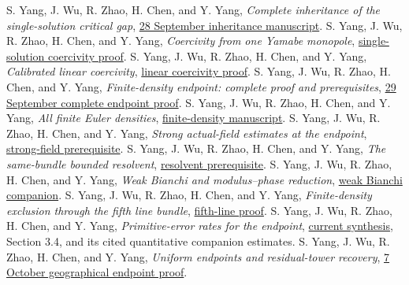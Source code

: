 \documentclass[11pt,a4paper]{article}
\theoremstyle{definition}
\theoremstyle{remark}
\newcommand{\repo}[2]{\href{https://github.com/Cherish0925/Geometric-Analysis/blob/main/#1}{#2}}
\begin{document}
\begin{thebibliography}{99}
 S. Yang, J. Wu, R. Zhao, H. Chen, and Y. Yang, \emph{Complete inheritance of the single-solution critical gap}, \repo{archive/originals/2026-09-28/03_N1_Complete_Inheritance.md}{28 September inheritance manuscript}.
 S. Yang, J. Wu, R. Zhao, H. Chen, and Y. Yang, \emph{Coercivity from one Yamabe monopole}, \repo{research/packages/20261007_Einstein_Gaps_Two_Sessions--9d4f2de3/20261007_Einstein_Gaps_Two_Sessions/sources/Skills/geometric-analysis/research/paper/sections/single_solution_coercivity.tex}{single-solution coercivity proof}.
 S. Yang, J. Wu, R. Zhao, H. Chen, and Y. Yang, \emph{Calibrated linear coercivity}, \repo{research/packages/20261007_Einstein_Gaps_Two_Sessions--9d4f2de3/20261007_Einstein_Gaps_Two_Sessions/sources/Skills/geometric-analysis/research/paper/sections/linear_coercivity.tex}{linear coercivity proof}.
 S. Yang, J. Wu, R. Zhao, H. Chen, and Y. Yang, \emph{Finite-density endpoint: complete proof and prerequisites}, \repo{archive/originals/2026-09-29/O10_Finite_Density_Complete_Proof.tex}{29 September complete endpoint proof}.
 S. Yang, J. Wu, R. Zhao, H. Chen, and Y. Yang, \emph{All finite Euler densities}, \repo{archive/originals/2026-09-29/O10_All_Finite_Density.md}{finite-density manuscript}.
 S. Yang, J. Wu, R. Zhao, H. Chen, and Y. Yang, \emph{Strong actual-field estimates at the endpoint}, \repo{archive/originals/2026-09-29/O10_Strong_Current_Prerequisite.md}{strong-field prerequisite}.
 S. Yang, J. Wu, R. Zhao, H. Chen, and Y. Yang, \emph{The same-bundle bounded resolvent}, \repo{archive/originals/2026-09-29/O10_Direct_Resolvent_Prerequisite.md}{resolvent prerequisite}.
 S. Yang, J. Wu, R. Zhao, H. Chen, and Y. Yang, \emph{Weak Bianchi and modulus--phase reduction}, \repo{archive/originals/2026-09-29/O10_Weak_Bianchi.md}{weak Bianchi companion}.
 S. Yang, J. Wu, R. Zhao, H. Chen, and Y. Yang, \emph{Finite-density exclusion through the fifth line bundle}, \repo{archive/originals/2026-09-29/O10_Finite_Density_Fifth_Line.md}{fifth-line proof}.
 S. Yang, J. Wu, R. Zhao, H. Chen, and Y. Yang, \emph{Primitive-error rates for the endpoint}, \repo{docs/GAPS_AND_ENDPOINTS.md}{current synthesis}, Section 3.4, and its cited quantitative companion estimates.
 S. Yang, J. Wu, R. Zhao, H. Chen, and Y. Yang, \emph{Uniform endpoints and residual-tower recovery}, \repo{archive/originals/2026-10-07/Line1_Uniform_Endpoint_and_Residual_Tower_Recovery.md}{7 October geographical endpoint proof}.

\end{thebibliography}
\end{document}
